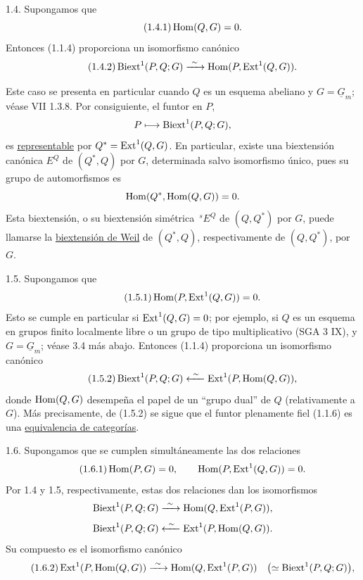 1.4. Supongamos que
\begin{equation}\tag{1.4.1}
 \uHom(Q,G)=0.
\end{equation}
Entonces (1.1.4) proporciona un isomorfismo canónico
\begin{equation}\tag{1.4.2}
 \Biext^1(P,Q;G)
 \xrightarrow{\ \sim\ }
 \Hom(P,\uExt^1(Q,G)).
\end{equation}


Este caso se presenta en particular cuando $Q$ es un esquema abeliano
y $G=\underline G_m$; véase VII 1.3.8. Por consiguiente, el funtor en
$P$,
\[
 P\longmapsto\Biext^1(P,Q;G),
\]
es \underline{representable} por $Q^*=\uExt^1(Q,G)$. En particular,
existe una biextensión canónica $E^Q$ de $(Q^*,Q)$ por $G$,
determinada salvo isomorfismo único, pues su grupo de automorfismos es
\[
 \Hom(\sisi{P}{Q^*},\uHom(Q,G))=0.
\]
Esta biextensión, o su biextensión simétrica $\,{}^sE^Q$ de
$(Q,Q^*)$ por $G$, puede llamarse la \underline{biextensión de Weil}
de $(Q^*,Q)$, respectivamente de $(Q,Q^*)$, por $G$.

1.5. Supongamos que
\begin{equation}\tag{1.5.1}
 \Hom(P,\uExt^1(Q,G))=0.
\end{equation}
Esto se cumple en particular si $\uExt^1(Q,G)=0$; por ejemplo, si $Q$
es un esquema en grupos finito localmente libre o un grupo de tipo
multiplicativo (SGA 3 IX), y $G=\underline G_m$; véase 3.4 más abajo.
Entonces (1.1.4) proporciona un isomorfismo canónico
\begin{equation}\tag{1.5.2}
 \Biext^1(P,Q;G)
 \xleftarrow{\ \sim\ }
 \Ext^1(P,\uHom(Q,G)),
\end{equation}
donde $\uHom(Q,G)$ desempeña el papel de un ``grupo dual'' de $Q$
(relativamente a $G$). Más precisamente, de (1.5.2) se sigue que el
funtor plenamente fiel (1.1.6) es una \underline{equivalencia de
categorías}.

1.6. Supongamos que se cumplen simultáneamente las dos relaciones
\begin{equation}\tag{1.6.1}
 \uHom(P,G)=0,\qquad
 \Hom(P,\uExt^1(Q,G))=0.
\end{equation}
Por 1.4 y 1.5, respectivamente, estas dos relaciones dan los
isomorfismos
\[
 \Biext^1(P,Q;G)
 \xrightarrow{\ \sim\ }
 \Hom(Q,\uExt^1(P,G)),
\]
\[
 \Biext^1(P,Q;G)
 \xleftarrow{\ \sim\ }
 \Ext^1(P,\uHom(Q,G)).
\]
Su compuesto es el isomorfismo canónico
\begin{equation}\tag{1.6.2}
 \Ext^1(P,\uHom(Q,G))
 \xrightarrow{\ \sim\ }
 \Hom(Q,\uExt^1(P,G))
 \quad\bigl(\simeq\Biext^1(P,\sisi{G}{Q};G)\bigr),
\end{equation}

